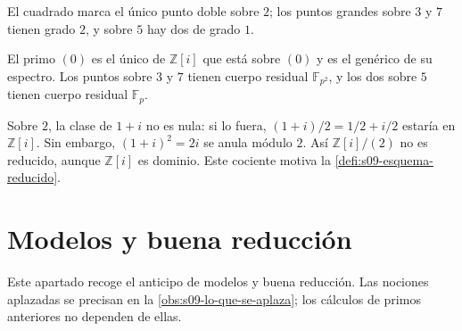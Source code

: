 \par\noindent\begin{minipage}{\linewidth}
\begin{center}
\end{center}
El cuadrado marca el único punto doble sobre $2$; los puntos grandes sobre $3$ y $7$ tienen grado $2$, y sobre $5$ hay dos de grado $1$.
\end{minipage}\par

\begin{obs}
\label{obs:s09-lectura-cociente-gaussiano}
El primo $(0)$ es el único de $\mathbb Z[i]$ que está sobre $(0)$ y es el genérico de su espectro. Los puntos sobre $3$ y $7$ tienen cuerpo residual $\mathbb F_{p^2}$, y los dos sobre $5$ tienen cuerpo residual $\mathbb F_p$.

Sobre $2$, la clase de $1+i$ no es nula: si lo fuera, $(1+i)/2=1/2+i/2$ estaría en $\mathbb Z[i]$. Sin embargo, $(1+i)^2=2i$ se anula módulo $2$. Así $\mathbb Z[i]/(2)$ no es reducido, aunque $\mathbb Z[i]$ es dominio. Este cociente motiva la \cref{defi:s09-esquema-reducido}.
\end{obs}

\section{Modelos y buena reducción}
\label{sec:s09-modelos}
Este apartado recoge el anticipo de modelos y buena reducción. Las nociones aplazadas se precisan en la \cref{obs:s09-lo-que-se-aplaza}; los cálculos de primos anteriores no dependen de ellas.

